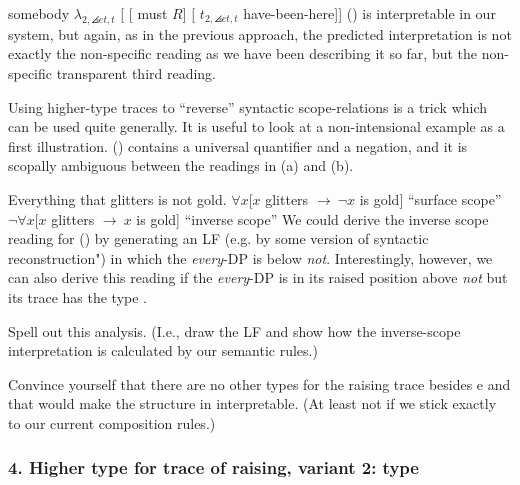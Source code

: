 \ex somebody $\lambda_{2,\angles{et,t}}$ [ [ must $R$] [ $t_{2,\angles{et,t}}$ have-been-here]]\xe
%
%
(\lastx) is interpretable in our system, but again, as in the previous approach,
the predicted interpretation is not exactly the non-specific reading as we have
been describing it so far, but the non-specific transparent third reading.

\begin{exercise}
	
	Using higher-type traces to ``reverse'' syntactic scope-relations is a trick
  which can be used quite generally. It is useful to look at a non-intensional
  example as a first illustration. (\nextx) contains a universal quantifier and
  a negation, and it is scopally ambiguous between the readings in (a) and (b).
	
	\pex Everything that glitters is not gold.
  \a $\forall x[ x$ glitters $\rightarrow\ \ensuremath{\neg} x$ is gold]
  \hfill``surface scope''
  \a $\ensuremath{\neg}\forall x[ x$ glitters $\rightarrow\ x$ is gold]
  \hfill``inverse scope''
  \xe
%	
	We could derive the inverse scope reading for (\lastx) by generating an LF
  (e.g. by some version of syntactic reconstruction") in which the
  \emph{every}-DP is below \emph{not}. Interestingly, however, we can also
  derive this reading if the \emph{every}-DP is in its raised position above
  \emph{not} but its trace has the type .
	
	Spell out this analysis. (I.e., draw the LF and show how the inverse-scope
  interpretation is calculated by our semantic rules.) \eex
\end{exercise}
\begin{exercise}
	
	Convince yourself that there are no other types for the raising trace besides
  e and  that would make the structure in 
  interpretable. (At least not if we stick exactly to our current composition
  rules.) \eex
\end{exercise}

\subsubsection{4. Higher type for trace of raising, variant 2: type }

